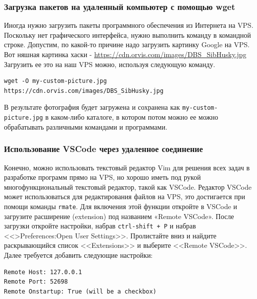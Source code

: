 \documentclass[12pt]{article}
\begin{document}
\hypertarget{Downloading-packages-to-your-remote-machine-with-wget}{%
\subsubsection{\texorpdfstring{\protect\hyperlink{Downloading-packages-to-your-remote-machine-with-wget}{}Загрузка
пакетов на удаленный компьютер с помощью
wget}{Загрузка пакетов на удаленный компьютер с помощью wget}}\label{Downloading-packages-to-your-remote-machine-with-wget}}

Иногда нужно загрузить пакеты программного обеспечения из Интернета на
VPS. Поскольку нет графического интерфейса, нужно выполнить команду в
командной строке. Допустим, по какой-то причине надо загрузить картинку
Google на VPS.
Вот няшная картинка хаски -
\url{https://cdn.orvis.com/images/DBS_SibHusky.jpg}
Загрузить ее это на наш VPS можно, используя следующую команду.
\begin{verbatim}
wget -O my-custom-picture.jpg https://cdn.orvis.com/images/DBS_SibHusky.jpg
\end{verbatim}
В результате фотография будет загружена и сохранена как
\texttt{my-custom-picture.jpg} в каком-либо каталоге, в котором потом
можно ее можно обрабатывать различными командами и программами.

\hypertarget{Using-VSCode-with-your-remote-machine}{%
\subsubsection{\texorpdfstring{\protect\hyperlink{Using-VSCode-with-your-remote-machine}{}Использование
VSCode через удаленное
соединение}{Использование VSCode через удаленное соединение}}\label{Using-VSCode-with-your-remote-machine}}

Конечно, можно использовать текстовый редактор Vim для решения всех
задач в разработке программ прямо на VPS, но хорошо иметь под рукой
многофункциональный текстовый редактор, такой как VSCode. Редактор
VSCode может использоваться для редактирования файлов на VPS, это
достигается при помощи команды \texttt{rmate}. Для включения этой
функции откройте в VSCode и загрузите расширение (extension) под
названием «Remote VSCode». После загрузки откройте настройки, набрав
\texttt{ctrl-shift + P} и набрав <<\textgreater Preferences:Open User Settings>>.
Пролистайте вниз и найдите раскрывающийся список <<Extensions>> и выберите
<<Remote VSCode>>. Далее требуется добавить следующие настройки:
\begin{verbatim}
Remote Host: 127.0.0.1
Remote Port: 52698
Remote Onstartup: True (will be a checkbox)
\end{verbatim}
\end{document}
